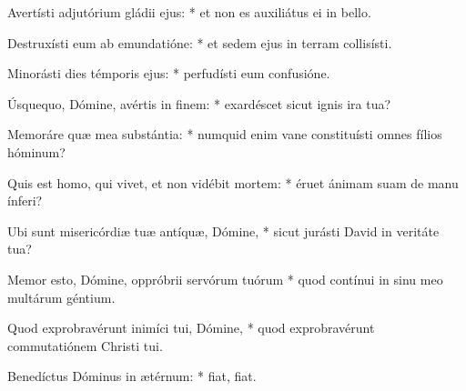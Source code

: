\begin{psalmus}
    Avertísti adjutórium gládii ejus: * et non es auxiliátus ei in bello.

    Destruxísti eum ab emundatióne: * et sedem ejus in terram collisísti.

    Minorásti dies témporis ejus: * perfudísti eum confusióne.

    Úsquequo, Dómine, avértis in finem: * exardéscet sicut ignis ira tua?

    Memoráre quæ mea substántia: * numquid enim vane constituísti omnes fílios hóminum?

    Quis est homo, qui vivet, et non vidébit mortem: * éruet ánimam suam de manu ínferi?

    Ubi sunt misericórdiæ tuæ antíquæ, Dómine, * sicut jurásti David in veritáte tua?

    Memor esto, Dómine, oppróbrii servórum tuórum * quod contínui in sinu meo multárum géntium.

    Quod exprobravérunt inimíci tui, Dómine, * quod exprobravérunt commutatiónem Christi tui.

    Benedíctus Dóminus in ætérnum: * fiat, fiat.

\end{psalmus}

